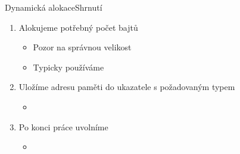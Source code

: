 \begin{frame}{Dynamická alokace}{Shrnutí}

  \begin{enumerate}
    \item Alokujeme potřebný počet bajtů
    \begin{itemize}
      \item Pozor na správnou velikost
      \item Typicky používáme 
    \end{itemize}

    \pause

    \item Uložíme adresu paměti do ukazatele s požadovaným typem
    \begin{itemize}
      \item {}
    \end{itemize}

    \pause

    \item Po konci práce uvolníme
    \begin{itemize}
      \item {}
    \end{itemize}
  \end{enumerate}

\end{frame}

